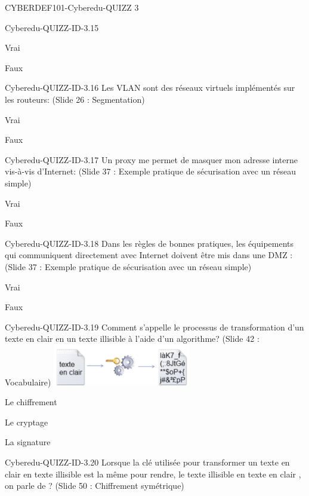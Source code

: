\documentclass[12pt]{article}
\begin{document}
\begin{quiz}{CYBERDEF101-Cyberedu-QUIZZ 3}
\begin{multi}[multiple=true]{Cyberedu-QUIZZ-ID-3.15}
\item Vrai
\item* Faux
\end{multi}
\begin{multi}[multiple=true]{Cyberedu-QUIZZ-ID-3.16}
	Les VLAN sont des r\'eseaux virtuels impl\'ement\'es sur les routeurs: (Slide 26 : Segmentation)
\item Vrai
\item* Faux
\end{multi}
\begin{multi}[multiple=true]{Cyberedu-QUIZZ-ID-3.17}
	Un proxy me permet de masquer mon adresse interne vis-\`{a}-vis d'Internet: (Slide 37 : Exemple pratique de s\'ecurisation avec un r\'eseau simple)
\item* Vrai
\item Faux
\end{multi}
\begin{multi}[multiple=true]{Cyberedu-QUIZZ-ID-3.18}
	Dans les r\`egles de bonnes pratiques, les \'equipements qui communiquent directement avec Internet doivent \^etre mis dans une DMZ : (Slide 37 : Exemple pratique de s\'ecurisation avec un r\'eseau simple)
\item* Vrai
\item Faux
\end{multi}
\begin{multi}[multiple=true]{Cyberedu-QUIZZ-ID-3.19}
	Comment s'appelle le processus de transformation d'un texte  en clair   en un  texte illisible  \`{a} l'aide d'un algorithme? (Slide 42 : Vocabulaire)
	\includegraphics[width=6cm]{img/img3-19}
\item* Le chiffrement
\item Le cryptage
\item La signature
 \end{multi}
\begin{multi}[multiple=true]{Cyberedu-QUIZZ-ID-3.20}
	Lorsque la cl\'e utilis\'ee pour transformer un texte  en clair  en texte illisible est la m\^eme pour rendre, le texte  illisible  en texte  en clair , on parle de ? (Slide 50 : Chiffrement sym\'etrique)

\end{multi}
\end{quiz}
\end{document}
